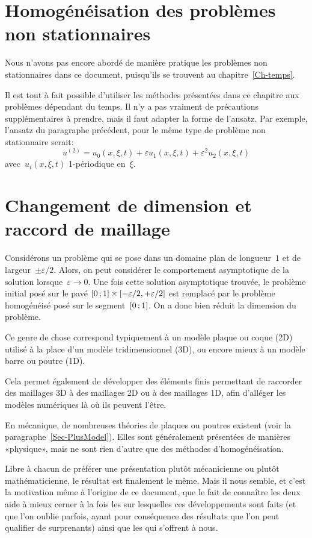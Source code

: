\medskip
\section{Homogénéisation des problèmes non stationnaires}

Nous n'avons pas encore abordé de manière pratique les problèmes non stationnaires dans ce document, puisqu'ils se trouvent au chapitre~\ref{Ch-temps}.

Il est tout à fait possible d'utiliser les méthodes présentées dans ce chapitre aux problèmes dépendant du temps. Il n'y a pas vraiment de précautions supplémentaires à prendre, mais il faut adapter la forme de l'ansatz. Par exemple, l'ansatz du paragraphe précédent, pour le même type de problème non stationnaire serait:
\begin{equation}u^{(2)} = u_0(x,\xi,t)+\varepsilon u_1(x,\xi,t) + \varepsilon^2 u_2(x,\xi,t)\end{equation}
avec~$u_i(x,\xi,t)$ 1-périodique en~$\xi$.

\medskip
\section{Changement de dimension et raccord de maillage}


\medskip
Considérons un problème qui se pose dans un domaine plan de longueur~$1$ et de largeur~$\pm\varepsilon/2$. Alors, on peut considérer le comportement asymptotique de la solution lorsque~$\varepsilon \longrightarrow 0$. Une fois cette solution asymptotique trouvée, le problème initial posé sur le pavé $\mathopen{[}0\,;1\mathclose{]}\times[-\varepsilon/2,+\varepsilon/2]$ est remplacé par le problème homogénéisé posé sur le segment~$\mathopen{[}0\,;1\mathclose{]}$. On a donc bien réduit la dimension du problème.

\medskip
Ce genre de chose correspond typiquement à un modèle plaque ou coque (2D) utilisé à la place d'un modèle tridimensionnel (3D), ou encore mieux à un modèle barre ou poutre (1D).

Cela permet également de développer des éléments finis permettant de raccorder des maillages 3D à des maillages 2D ou à des maillages 1D, afin d'alléger les modèles numériques là où ils peuvent l'être.

\medskip
En mécanique, de nombreuses théories de plaques ou poutres existent (voir la paragraphe~\ref{Sec-PlusModel}). Elles sont généralement présentées de manières «physique», mais ne sont rien d'autre que des méthodes d'homogénéisation.

Libre à chacun de préférer une présentation plutôt mécanicienne ou plutôt mathématicienne, le résultat est finalement le même. Mais il nous semble, et c'est la motivation même à l'origine de ce document, que le fait de connaître les deux aide à mieux cerner à la fois les  sur lesquelles ces développements sont faits (et que l'on oublie parfois, ayant pour conséquence des résultats que l'on peut qualifier de surprenants) ainsi que les  qui s'offrent à nous. 
